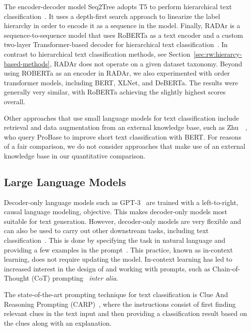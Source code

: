 \documentclass[acmsmall,nonacm]{acmart}
\begin{document}
The encoder-decoder model Seq2Tree adopts T5 to perform hierarchical text classification~\cite{seq2tree}.
It uses a depth-first search approach to linearize the label hierarchy in order to encode it as a sequence in the model.
Finally, RADAr is a sequence-to-sequence model that uses RoBERTa as a text encoder and a custom two-layer Transformer-based decoder for hierarchical text classification~\cite{radar}.
In contrast to hierarchical text classification methods, see Section~\ref{sec:rw:hierarcy-based-methods}, RADAr does not operate on a given dataset taxonomy.
Beyond using ROBERTa as an encoder in RADAr, we also experimented with order transformer models, including BERT, XLNet, and DeBERTa. The results were generally very similar, with RoBERTa achieving the slightly highest scores overall.

Other approaches that use small language models for text classification include retrieval and data augmentation from an external knowledge base, such as Zhu~\etal~\cite{zhu2023}, who query ProBase to improve short text classification with BERT. For reasons of a fair comparison, we do not consider approaches that make use of an external knowledge base in our quantitative comparison.

\subsection{Large Language Models}

Decoder-only language models such as GPT-3~\cite{DBLP:conf/nips/BrownMRSKDNSSAA20} are trained with a left-to-right, \ie causal language modeling, objective. This makes decoder-only models most suitable for text generation. 
However, decoder-only models are very flexible and can also be used to carry out other downstream tasks, including text classification~\cite{DBLP:conf/nips/BrownMRSKDNSSAA20,radfordLanguageModelsAre}. 
This is done by specifying the task in natural language and providing a few examples in the prompt~\cite{DBLP:conf/nips/BrownMRSKDNSSAA20}. 
This practice, known as in-context learning, does not require updating the model. 
In-context learning has led to increased interest in the design of and working with prompts, such as Chain-of-Thought (CoT) prompting~\cite{weiChainofThoughtPromptingElicits2023} \emph{inter alia}.

The state-of-the-art prompting technique for text classification is Clue And Reasoning Prompting (CARP)~\cite{carp}, where the instructions consist of first finding relevant clues in the text input and then providing a classification result based on the clues along with an explanation. 
\end{document}
